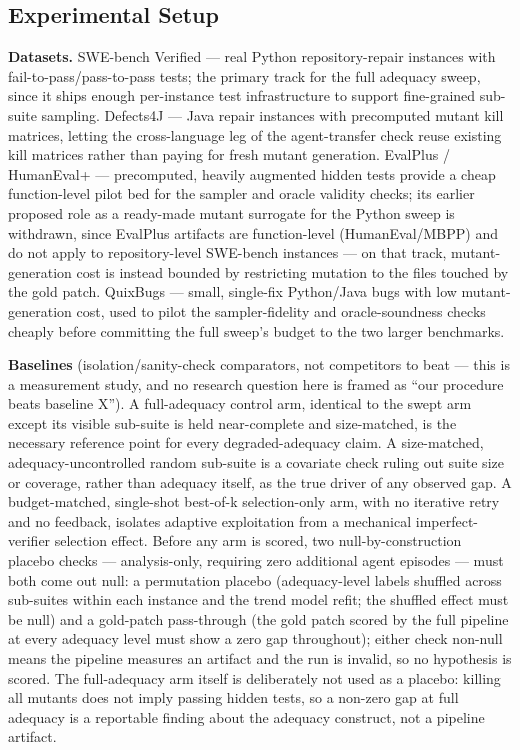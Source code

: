 \documentclass[11pt]{article}
\begin{document}
\subsection{Experimental Setup}

\textbf{Datasets.} SWE-bench Verified \citep{SWEbench_VTF8yNQM66} --- real Python repository-repair instances with fail-to-pass/pass-to-pass tests; the primary track for the full adequacy sweep, since it ships enough per-instance test infrastructure to support fine-grained sub-suite sampling. Defects4J \citep{Defects4J_Just2014} --- Java repair instances with precomputed mutant kill matrices, letting the cross-language leg of the agent-transfer check reuse existing kill matrices rather than paying for fresh mutant generation. EvalPlus / HumanEval+ \citep{EvalPlus_Liu2023} --- precomputed, heavily augmented hidden tests provide a cheap function-level pilot bed for the sampler and oracle validity checks; its earlier proposed role as a ready-made mutant surrogate for the Python sweep is withdrawn, since EvalPlus artifacts are function-level (HumanEval/MBPP) and do not apply to repository-level SWE-bench instances --- on that track, mutant-generation cost is instead bounded by restricting mutation to the files touched by the gold patch. QuixBugs \citep{QuixBugs_Lin2017} --- small, single-fix Python/Java bugs with low mutant-generation cost, used to pilot the sampler-fidelity and oracle-soundness checks cheaply before committing the full sweep's budget to the two larger benchmarks.

\textbf{Baselines} (isolation/sanity-check comparators, not competitors to beat --- this is a measurement study, and no research question here is framed as ``our procedure beats baseline X''). A full-adequacy control arm, identical to the swept arm except its visible sub-suite is held near-complete and size-matched, is the necessary reference point for every degraded-adequacy claim. A size-matched, adequacy-uncontrolled random sub-suite is a covariate check ruling out suite size or coverage, rather than adequacy itself, as the true driver of any observed gap. A budget-matched, single-shot best-of-k selection-only arm, with no iterative retry and no feedback, isolates adaptive exploitation from a mechanical imperfect-verifier selection effect. Before any arm is scored, two null-by-construction placebo checks --- analysis-only, requiring zero additional agent episodes --- must both come out null: a permutation placebo (adequacy-level labels shuffled across sub-suites within each instance and the trend model refit; the shuffled effect must be null) and a gold-patch pass-through (the gold patch scored by the full pipeline at every adequacy level must show a zero gap throughout); either check non-null means the pipeline measures an artifact and the run is invalid, so no hypothesis is scored. The full-adequacy arm itself is deliberately not used as a placebo: killing all mutants does not imply passing hidden tests, so a non-zero gap at full adequacy is a reportable finding about the adequacy construct, not a pipeline artifact.
\end{document}
